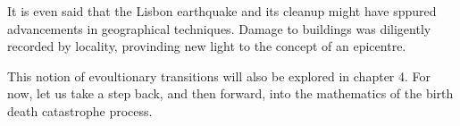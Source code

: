 It is even said that the Lisbon earthquake and its cleanup might have sppured advancements in geographical techniques. Damage to buildings 
was diligently recorded by locality, provinding new light to the concept of an epicentre.\par
This notion of evoultionary transitions will also be explored in chapter 4. For now, let us take a step back, and then forward, into the mathematics of the birth death catastrophe process.



